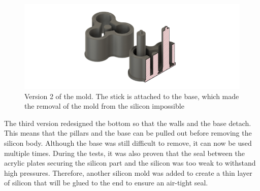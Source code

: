 \documentclass[twoside]{article}
\begin{document}
\begin{figure} [H]
\centering
\includegraphics{mold v2}
\caption{Version 2 of the mold. The stick is attached to the base, which made the removal of the mold from the silicon impossible}
\end{figure}

The third version redesigned the bottom so that the walls and the base detach. This means that the pillars and the base can be pulled out before removing the silicon body. Although the base was still difficult to remove, it can now be used multiple times. During the tests, it was also proven that the seal between the acrylic plates securing the silicon part and the silicon was too weak to withstand high pressures. Therefore, another silicon mold was added to create a thin layer of silicon that will be glued to the end to ensure an air-tight seal. 
\end{document}
